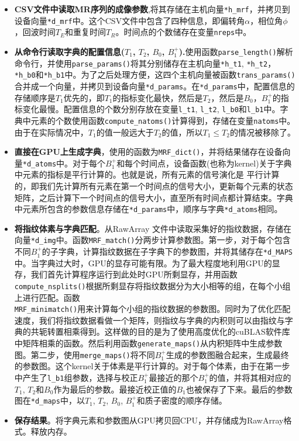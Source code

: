 \begin{itemize}
\item \textbf{CSV文件中读取MR序列的成像参数},将其存储在主机向量\texttt{*h\_mrf}，并拷贝到设备向量\texttt{*d\_mrf}中。这个CSV文件中包含了四种信息，即偏转角$\alpha$，相位角$\phi$，回波时间$T_E$和重复时间$T_R$。时间点的个数储存在变量\texttt{nreps}中。

\item \textbf{从命令行读取字典的配置信息($T_1$, $T_2$, $B_0$, $B_1^+$).}使用函数\texttt{parse\_length()}解析命令行，并使用\texttt{parse\_params()}将其分别储存在主机向量\texttt{*h\_t1}, \texttt{*h\_t2}，\texttt{*h\_b0}和\texttt{*h\_b1}中。为了之后处理方便，这四个主机向量被函数\texttt{trans\_params()}合并成一个向量，并拷贝到设备向量\texttt{*d\_params}。在\texttt{*d\_params}中，配置信息的存储顺序是$T_1$优先的，即$T_1$的指标变化最快，然后是$T_2$，然后是$B_0$，$B_1^+$的指标变化最慢。配置信息的个数分别存放在变量\texttt{l\_t1}, \texttt{l\_t2}, \texttt{l\_b0}和\texttt{l\_b1}中。字典中元素的个数使用函数\texttt{compute\_natoms()}计算得到，存储在变量\texttt{natoms}中。由于在实际情况中，$T_1$的值一般远大于$T_2$的值，所以$T_1 \le T_2$的情况被移除了。

\item \textbf{直接在GPU上生成字典}，使用的函数为\texttt{MRF\_dict()}，并将结果储存在设备向量\texttt{*d\_atoms}中。对于每个$B_1^+$和每个时间点，设备函数(也称为kernel)关于字典中元素的指标是平行计算的。也就是说，所有元素的信号演化是
	平行计算的，即我们先计算所有元素在第一个时间点的信号大小，更新每个元素的状态矩阵，之后计算下一个时间点的信号大小，直至所有时间点都计算结束。字典中元素所包含的参数信息存储在\texttt{*d\_params}中，顺序与字典\texttt{*d\_atoms}相同。

\item \textbf{将指纹体素与字典匹配}。从RawArray \cite{RawArray}文件中读取采集好的指纹数据，存储在向量\texttt{*d\_img}中。函数\texttt{MRF\_match()}分两步计算参数图。第一步，对于每个包含不同$B_1^+$的子字典，计算指纹数据在子字典下的参数图，并将其储存在\texttt{*d\_MAPS}中。当字典过大时，GPU的显存可能有限。为了最大程度地利用GPU的显存，我们首先计算程序运行到此处时GPU所剩显存，并用函数\texttt{compute\_nsplits()}根据所剩显存将指纹数据分为大小相等的组，在每个小组上进行匹配。函数\\ \texttt{MRF\_minimatch()}用来计算每个小组的指纹数据的参数图。同时为了优化匹配速度，我们将指纹数据看做一个矩阵，则指纹与字典的内积则可以由指纹与字典的共轭转置相乘得到。这样做的目的是为了使用高度优化的cuBLAS软件库中矩阵相乘的函数。然后利用函数\texttt{generate\_maps()}从内积矩阵中生成参数图。第二步，使用\texttt{merge\_maps()}将不同$B_1^+$生成的参数图融合起来，生成最终的参数图。这个kernel关于体素是平行计算的。对于每个体素，由于在第一步中产生了\texttt{l\_b1}组参数，选择与校正$B_1^+$最接近的那个$B_1^+$的值，并将其相对应的$T_1$, $T_2$和$B_0$作为最后的参数。最接近校正值的$B_1$也被保存了下来。最后的参数图在\texttt{*d\_maps}中，以$T_1$, $T_2$, $B_0$, $B_1^+$和质子密度的顺序存储。

\item \textbf{保存结果}。将字典元素和参数图从GPU拷贝回CPU，并存储成为RawArray格式。释放内存。

\end{itemize}
